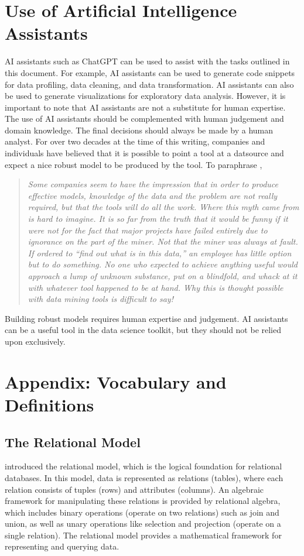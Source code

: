 \documentclass{article}
\begin{document}
\section{Use of Artificial Intelligence Assistants}
AI assistants such as ChatGPT can be used to assist with the tasks outlined in this document. For example, AI assistants can be used to generate code snippets for data profiling, data cleaning, and data transformation. AI assistants can also be used to generate visualizations for exploratory data analysis. However, it is important to note that AI assistants are not a substitute for human expertise. The use of AI assistants should be complemented with human judgement and domain knowledge. The final decisions should always be made by a human analyst. For over two decades at the time of this writing, companies and individuals have believed that it is possible to point a tool at a datsource and expect a nice robust model to be produced by the tool. To paraphrase \cite{pyle1999data},\begin{quote}
    \emph{Some companies seem to have the impression that in order to produce effective models,
knowledge of the data and the problem are not really required, but that the tools will do all
the work. Where this myth came from is hard to imagine. It is so far from the truth that it
would be funny if it were not for the fact that major projects have failed entirely due to
ignorance on the part of the miner. Not that the miner was always at fault. If ordered to
“find out what is in this data,” an employee has little option but to do something. No one
who expected to achieve anything useful would approach a lump of unknown substance,
put on a blindfold, and whack at it with whatever tool happened to be at hand. Why this is
thought possible with data mining tools is difficult to say!}
\end{quote}
Building robust models requires human expertise and judgement. AI assistants can be a useful tool in the data science toolkit, but they should not be relied upon exclusively.


\printbibliography

\section*{Appendix: Vocabulary and Definitions}


\subsection*{The Relational Model}
\cite{codd1970relational} introduced the relational model, which is the logical foundation for relational databases. In this model, data is represented as relations (tables), where each relation consists of tuples (rows) and attributes (columns). An algebraic framework for manipulating these relations is provided by relational algebra, which includes binary operations (operate on two relations) such as join and union, as well as unary operations like selection and projection (operate on a single relation). The relational model provides a mathematical framework for representing and querying data.
\end{document}
